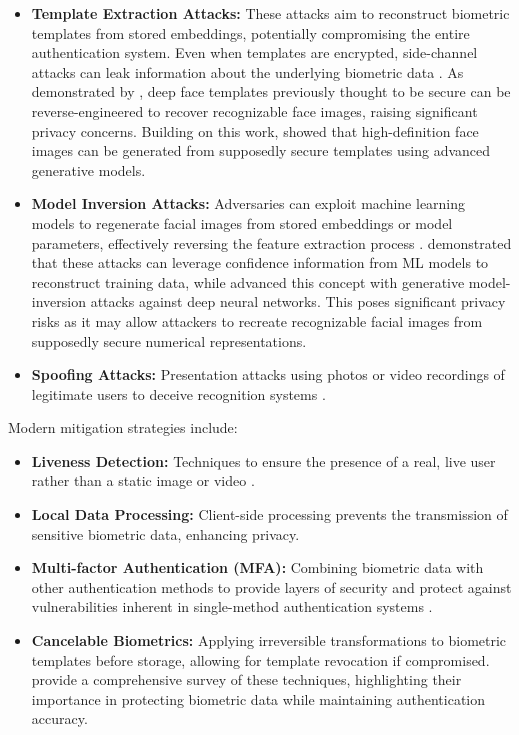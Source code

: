 \begin{itemize}
\item \textbf{Template Extraction Attacks:} These attacks aim to reconstruct biometric templates from stored embeddings, potentially compromising the entire authentication system. Even when templates are encrypted, side-channel attacks can leak information about the underlying biometric data \autocite{Mai2019, Dong2021}. As demonstrated by \textcite{Mai2019}, deep face templates previously thought to be secure can be reverse-engineered to recover recognizable face images, raising significant privacy concerns. Building on this work, \textcite{Dong2021} showed that high-definition face images can be generated from supposedly secure templates using advanced generative models.

\item \textbf{Model Inversion Attacks:} Adversaries can exploit machine learning models to regenerate facial images from stored embeddings or model parameters, effectively reversing the feature extraction process \autocite{Fredrikson2015, Zhang2020}. \textcite{Fredrikson2015} demonstrated that these attacks can leverage confidence information from ML models to reconstruct training data, while \textcite{Zhang2020} advanced this concept with generative model-inversion attacks against deep neural networks. This poses significant privacy risks as it may allow attackers to recreate recognizable facial images from supposedly secure numerical representations.

\item \textbf{Spoofing Attacks:} Presentation attacks using photos or video recordings of legitimate users to deceive recognition systems \autocite{Kuznetsov2024}.
\end{itemize}

\clearpage

Modern mitigation strategies include:
\begin{itemize}
\item \textbf{Liveness Detection:} Techniques to ensure the presence of a real, live user rather than a static image or video \autocite{Kuznetsov2024}.

\item \textbf{Local Data Processing:} Client-side processing prevents the transmission of sensitive biometric data, enhancing privacy.

\item \textbf{Multi-factor Authentication (MFA):} Combining biometric data with other authentication methods to provide layers of security and protect against vulnerabilities inherent in single-method authentication systems \autocite{Furnell2022}.

\item \textbf{Cancelable Biometrics:} Applying irreversible transformations to biometric templates before storage, allowing for template revocation if compromised. \textcite{Rathgeb2011} provide a comprehensive survey of these techniques, highlighting their importance in protecting biometric data while maintaining authentication accuracy.
\end{itemize}

